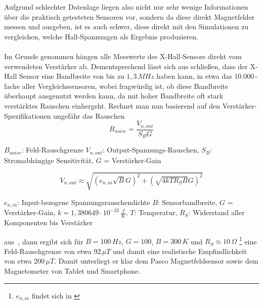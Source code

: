 \documentclass[12pt, a4paper]{article}
\renewcommand{\footnotesize}{\fontsize{10pt}{12pt}\selectfont}
\begin{document}
Aufgrund schlechter Datenlage liegen also nicht nur sehr wenige Informationen über die praktisch getesteten Sensoren vor, sondern da diese direkt Magnetfelder messen und ausgeben, ist es auch schwer, diese direkt mit den Simulationen zu vergleichen, welche Hall-Spannungen als Ergebnis produzieren.\paragraph{}
Im Grunde genommen hängen alle Messwerte des X-Hall-Sensors direkt vom verwendeten Verstärker ab. Dementsprechend lässt sich aus \cite{texInsAmp} schließen, dass der X-Hall Sensor eine Bandbreite von bis zu $1,3\,MHz$ haben kann, in etwa das $10.000\,$-fache aller Vergleichssensoren, wobei fragwürdig ist, ob diese Bandbreite überhaupt ausgenutzt werden kann, da mit hoher Bandbreite oft stark verstärktes Rauschen einhergeht.\newline
Rechnet man nun basierend auf den Verstärker-Spezifikationen ungefähr das Rauschen
\begin{equation}
	B_{noise}=\frac{V_{n,out}}{S_BG}
	\tag{5.2}
	\label{5.2}
\end{equation}

\vspace{-0.8em}
\begin{center}
	\footnotesize
	$B_{noise}$: Feld-Rauschgrenze $V_{n,out}$: Output-Spannungs-Rauschen, $S_B$: Stromabhängige Sensitivität, \newline
	$G$ = Verstärker-Gain
\end{center}

\begin{equation}
	V_{n,out}\approx\sqrt{(e_{n,ia}\sqrt{B}G)^2+(\sqrt{4kTR_SB}G)^2}
	\tag{5.3}
	\label{5.3}
\end{equation}

\vspace{-0.8em}
\begin{center}
	\footnotesize
	$e_{n,ia}$: Input-bezogene Spannungsrauschendichte $B$: Sensorbandbreite, $G$ = Verstärker-Gain, $k=1,380649\cdot10^{-23}\,\frac{J}{K}$, $T$: Temperatur, $R_S$: Widerstand aller Komponenten bis Verstärker
\end{center}
aus\,\cite{analogNoise1}\,\cite{analogNoise2}\,\cite{analogNoise3}, dann ergibt sich für $B=100\,Hz$, $G=100$, $B=300\,K$ und $R_S\approx10\,\Omega$ \footnote{$e_{n,ia}$ findet sich in \cite{texInsAmp}} eine Feld-Rauschgrenze von etwa $92\,\mu{T}$ und damit eine realistische Empfindlichkeit von etwa $200\,\mu{T}$.
Damit unterliegt er klar dem Pasco Magnetfeldsensor sowie dem Magnetometer von Tablet und Smartphone.
\end{document}
